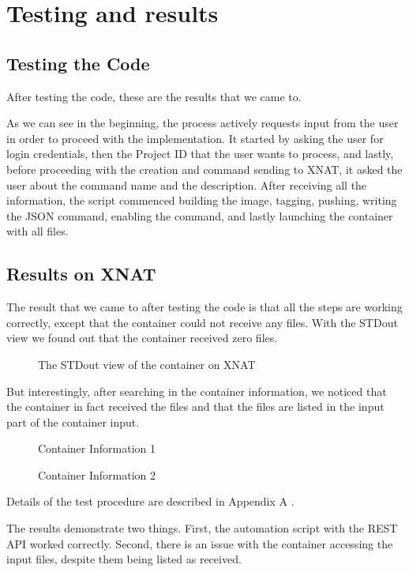 
\chapter{Testing and results}
\section{Testing the Code}
After testing the code, these are the results that we came to. 

As we can see in the beginning, the process actively requests input from the user in order to proceed with the implementation. It started by asking the user for login credentials, then the Project ID that the user wants to process, and lastly, before proceeding with the creation and command sending to XNAT, it asked the user about the command name and the description.
After receiving all the information, the script commenced building the image, tagging, pushing, writing the JSON command, enabling the command, and lastly launching the container with all files.

\section{Results on XNAT}
The result that we came to after testing the code is that all the steps are working correctly, except that the container could not receive any files. With the \ac{STDout} view we found out that the container received zero files. 
 
\begin{figure}[ht]
    \centering
    \def\svgwidth{0.9\linewidth}
   
    \caption{The STDout view of the container on XNAT}
    \label{fig:enter-label}
\end{figure}

But interestingly, after searching in the container information, we noticed that the container in fact received the files and that the files are listed in the input part of the container input. 

\begin{figure}[ht]
    \centering
    \def\svgwidth{0.9\linewidth}
    
    \caption{Container Information 1}
    \label{fig:container-info-1}
\end{figure}







\begin{figure}[ht]
    \centering
    \def\svgwidth{0.9\linewidth}
    
    \caption{Container Information 2}
    \label{fig:container-info-1}
\end{figure}




Details of the test procedure are described in Appendix A \cite{bousfiha2025appendix}.

The results demonstrate two things. First, the automation script with the REST API worked correctly. Second, there is an issue with the container accessing the input files, despite them being listed as received.
